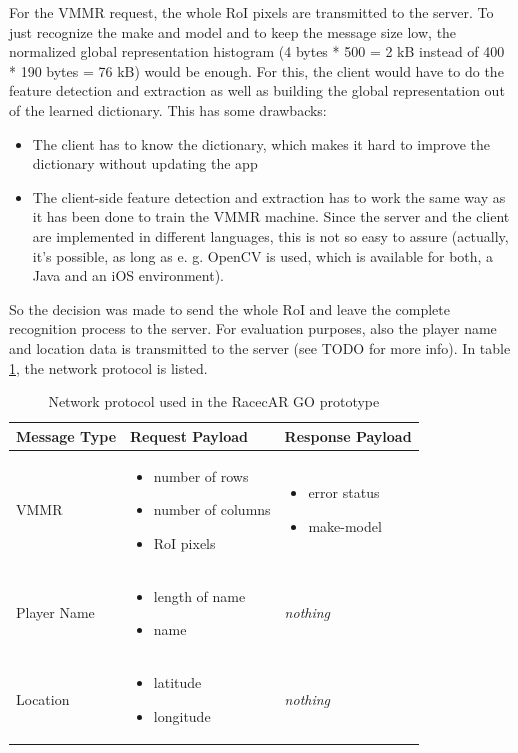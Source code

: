 For the VMMR request, the whole RoI pixels are transmitted to the server. To just recognize the make and model and to keep the message size low, the normalized global representation histogram (4 bytes * 500 = 2 kB instead of 400 * 190 bytes = 76 kB) would be enough. For this, the client would have to do the feature detection and extraction as well as building the global representation out of the learned dictionary. This has some drawbacks:
\begin{itemize}
  \item The client has to know the dictionary, which makes it hard to improve the dictionary without updating the app
  \item The client-side feature detection and extraction has to work the same way as it has been done to train the VMMR machine. Since the server and the client are implemented in different languages, this is not so easy to assure (actually, it's possible, as long as e. g. OpenCV is used, which is available for both, a Java and an iOS environment).
\end{itemize}
So the decision was made to send the whole RoI and leave the complete recognition process to the server. For evaluation purposes, also the player name and location data is transmitted to the server (see TODO for more info). In table \ref{table:network}, the network protocol is listed.
\begin{table}[btph]
  \centering
  \begin{tabular}{|p{}|p{}|p{}|}
	\hline
	\textbf{Message Type} & \textbf{Request Payload} & \textbf{Response Payload} \\ \hline
	VMMR &
	\begin{itemize}
	\item number of rows
	\item number of columns
	\item RoI pixels
	\end{itemize} &
	\begin{itemize}
	\item error status
	\item make-model
	\end{itemize} \\ \hline
	Player Name &
	\begin{itemize}
	\item length of name
	\item name
	\end{itemize} &
	\emph{nothing} \\ \hline
	Location &
	\begin{itemize}
	\item latitude
	\item longitude
	\end{itemize} &
	\emph{nothing} \\ \hline
  \end{tabular}
  \caption{Network protocol used in the RacecAR GO prototype}
  \label{table:network}
\end{table}

